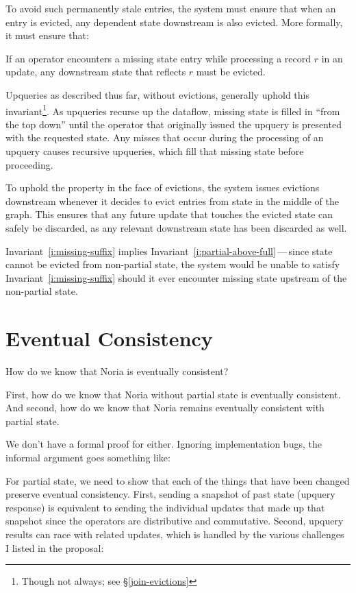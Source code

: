 To avoid such permanently stale entries, the system must ensure that when an
entry is evicted, any dependent state downstream is also evicted. More formally,
it must ensure that:

\begin{invariant}
  \label{i:missing-suffix}
  If an operator encounters a missing state entry while processing a record $r$
  in an update, any downstream state that reflects $r$ must be evicted.
\end{invariant}

Upqueries as described thus far, without evictions, generally uphold this
invariant\footnote{Though not always; see \S\ref{join-evictions}}. As upqueries
recurse up the dataflow, missing state is filled in ``from the top down'' until
the operator that originally issued the upquery is presented with the requested
state. Any misses that occur during the processing of an upquery causes
recursive upqueries, which fill that missing state before proceeding.

To uphold the property in the face of evictions, the system issues evictions
downstream whenever it decides to evict entries from state in the middle of the
graph. This ensures that any future update that touches the evicted state can
safely be discarded, as any relevant downstream state has been discarded as
well.

Invariant~\ref{i:missing-suffix} implies
Invariant~\ref{i:partial-above-full}\,---\,since state cannot be evicted from
non-partial state, the system would be unable to satisfy
Invariant~\ref{i:missing-suffix} should it ever encounter missing state upstream
of the non-partial state.

\section{Eventual Consistency}

\resume

How do we know that Noria is eventually consistent?

First, how do we know that Noria without partial state is eventually
consistent. And second, how do we know that Noria remains eventually
consistent with partial state.

We don't have a formal proof for either. Ignoring implementation bugs, the
informal argument goes something like:

For partial state, we need to show that each of the things that have been
changed preserve eventual consistency. First, sending a snapshot of past state
(upquery response) is equivalent to sending the individual updates that made
up that snapshot since the operators are distributive and commutative. Second,
upquery results can race with related updates, which is handled by the various
challenges I listed in the proposal:

